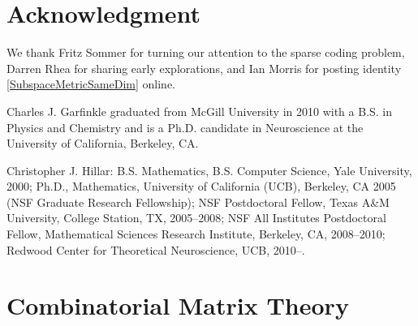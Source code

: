 \documentclass[journal, twocolumn]{IEEEtran}
\begin{document}
\section*{Acknowledgment}
We thank Fritz Sommer for turning our attention to the sparse coding problem, Darren Rhea for sharing early explorations, and Ian Morris for posting identity \eqref{SubspaceMetricSameDim} online.








\vspace{-1.1 cm}
\begin{IEEEbiographynophoto}{Charles J. Garfinkle}
graduated from McGill University in 2010 with a B.S. in Physics and Chemistry and is a Ph.D. candidate in Neuroscience at the University of California, Berkeley, CA.
\end{IEEEbiographynophoto}
\vspace{-1.1 cm} 
\begin{IEEEbiographynophoto}{Christopher J. Hillar:} B.S. Mathematics, B.S. Computer Science, Yale University, 2000; Ph.D., Mathematics, University of California (UCB), Berkeley, CA 2005 (NSF Graduate Research Fellowship); NSF Postdoctoral Fellow, Texas A\&M University, College Station, TX, 2005--2008; NSF All Institutes Postdoctoral Fellow, Mathematical Sciences Research Institute, Berkeley, CA, 2008--2010; Redwood Center for Theoretical Neuroscience, UCB, 2010--.  %
\end{IEEEbiographynophoto}


 \clearpage

\appendices
\section{Combinatorial Matrix Theory}\label{appendixA}
\end{document}
